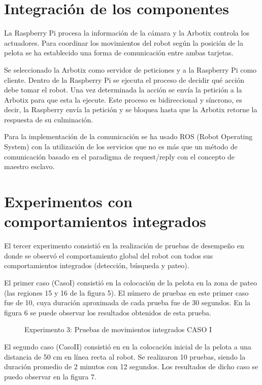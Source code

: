 \documentclass[tikz,conference, letterpaper]{IEEEtranMC1}
\begin{document}
\section{Integración de los componentes }
\label{sec:integracion}
La Raspberry Pi procesa la información de la cámara y la Arbotix controla los actuadores. Para coordinar los movimientos del robot según la posición de la pelota se ha establecido una forma de comunicación entre ambas tarjetas. 

Se seleccionado la Arbotix como servidor de peticiones y a la Raspberry Pi como cliente. Dentro de la Raspberry Pi se ejecuta el proceso de decidir qué acción debe tomar el robot. Una vez determinada la acción se envía la petición a la Arbotix para que esta la ejecute. Este proceso es  bidireccional y síncrono, es decir, la Raspberry envía la petición y se bloquea hasta que la Arbotix retorne la respuesta de su culminación.  

Para la implementación de la comunicación se ha usado ROS (Robot Operating System) con la utilización de los servicios que no es más que un método de comunicación basado en el paradigma de request/reply con el concepto de maestro esclavo.

\section{Experimentos con comportamientos integrados}
\label{sec:experimentosintegrados}

El tercer experimento consistió en la realización de pruebas de desempeño en donde se observó el comportamiento global del robot con todos sus comportamientos integrados (detección, búsqueda y pateo).

El  primer caso (CasoI) consistió en la colocación de la pelota en la zona de pateo (las regiones 15 y 16 de la figura 5). El número de pruebas en este primer caso fue de 10, cuya duración aproximada de cada prueba fue de 30 segundos. En la figura 6 se puede observar los resultados obtenidos de esta prueba.

\begin{figure}
\caption{Experimento 3: Pruebas de movimientos integrados CASO I}
\end{figure}

El segundo caso  (CasoII) consistió en en la colocación inicial de la pelota a una distancia de 50 cm en línea recta al robot. Se realizaron 10 pruebas, siendo la duración promedio de 2 minutos con 12 segundos. Los resultados de dicho caso se puedo observar en la figura 7. 
\end{document}
